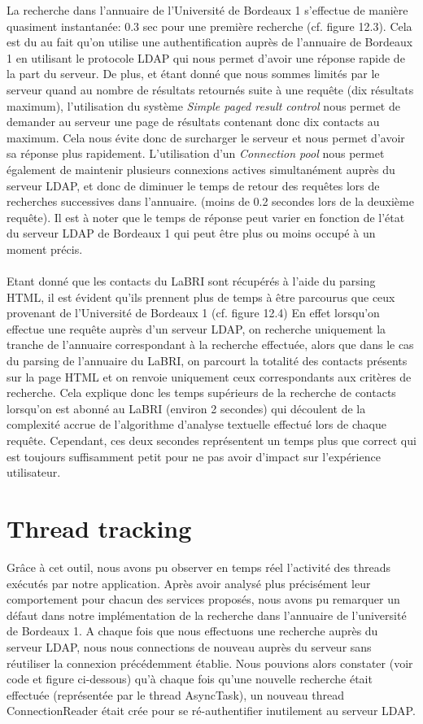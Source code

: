 La recherche dans l'annuaire de l'Université de Bordeaux 1 s'effectue de manière quasiment instantanée: 0.3 sec pour une première recherche (cf. figure 12.3). Cela est du au fait qu'on utilise une authentification auprès de l'annuaire de Bordeaux 1 en utilisant le protocole LDAP qui nous permet d'avoir une réponse rapide de la part du serveur. De plus, et étant donné que nous sommes limités par le serveur quand au nombre de résultats retournés suite à une requête (dix résultats maximum), l'utilisation du système \emph{Simple paged result control} nous permet de demander au serveur une page de résultats contenant donc dix contacts au maximum. Cela nous évite donc de surcharger le serveur et nous permet d'avoir sa réponse plus rapidement. L'utilisation d'un \emph{Connection pool} nous permet également de maintenir plusieurs connexions actives simultanément auprès du serveur LDAP, et donc de diminuer le temps de retour des requêtes lors de recherches successives dans l'annuaire. (moins de 0.2 secondes lors de la deuxième requête). Il est à noter que le temps de réponse peut varier en fonction de l'état du serveur LDAP de Bordeaux 1 qui peut être plus ou moins occupé à un moment précis.\\\\

Etant donné que les contacts du LaBRI sont récupérés à l'aide du parsing HTML, il est évident qu'ils prennent plus de temps à être parcourus que ceux provenant de l'Université de Bordeaux 1 (cf. figure 12.4) En effet lorsqu'on effectue une requête auprès d'un serveur LDAP, on recherche uniquement la tranche de l'annuaire correspondant à la recherche effectuée, alors que dans le cas du parsing de l'annuaire du LaBRI, on parcourt la totalité des contacts présents sur la page HTML et on renvoie uniquement ceux correspondants aux critères de recherche. Cela explique donc les temps supérieurs de la recherche de contacts lorsqu'on est abonné au LaBRI (environ 2 secondes) qui découlent de la complexité accrue de l'algorithme d'analyse textuelle effectué lors de chaque requête. Cependant, ces deux secondes représentent un temps plus que correct qui est toujours suffisamment petit pour ne pas avoir d'impact sur l'expérience utilisateur.


\section{Thread tracking}
Grâce à cet outil, nous avons pu observer en temps réel l’activité des threads exécutés par notre application. Après avoir analysé plus précisément leur comportement pour chacun des services proposés, nous avons pu remarquer un défaut dans notre implémentation de la recherche dans l’annuaire de l’université de Bordeaux 1. A chaque fois que nous effectuons une recherche auprès du serveur LDAP, nous nous connections de nouveau auprès du serveur sans réutiliser la connexion précédemment établie. Nous pouvions alors constater (voir code et figure ci-dessous) qu’à chaque fois qu’une nouvelle recherche était effectuée (représentée par le thread AsyncTask), un nouveau thread ConnectionReader  était crée pour se ré-authentifier inutilement au serveur LDAP.

